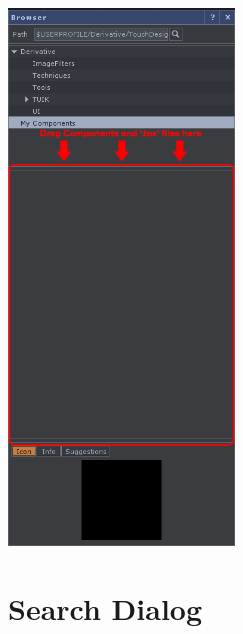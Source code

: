 \begin{fullwidth}
\begin{center}
\includegraphics[width=6cm]{./img/2.6/palette-1.png}
\end{center}

\end{fullwidth}
\section{Search Dialog}

